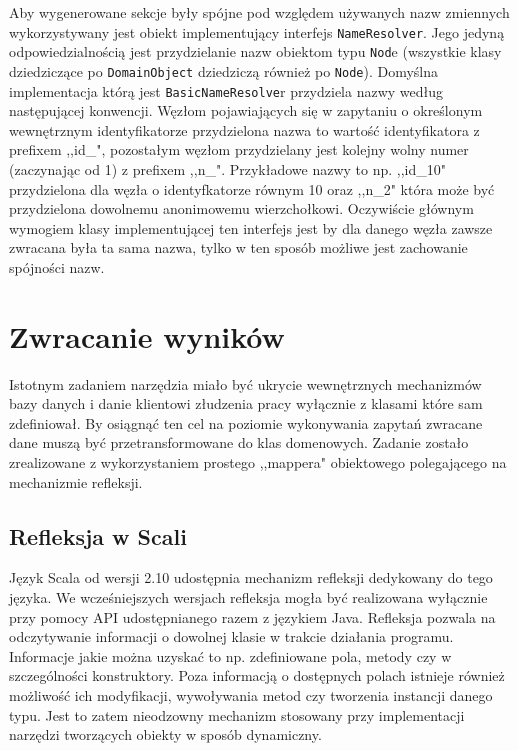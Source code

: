 \documentclass[brudnopis]{xmgr}
\begin{document}
Aby wygenerowane sekcje były spójne pod względem używanych nazw zmiennych wykorzystywany jest obiekt implementujący interfejs \texttt{NameResolver}. Jego jedyną odpowiedzialnością jest przydzielanie nazw obiektom typu \texttt{Nod}e (wszystkie klasy dziedziczące po \texttt{DomainObject} dziedziczą również po \texttt{Node}). Domyślna implementacja którą jest \texttt{BasicNameResolve}r przydziela nazwy według następującej konwencji. Węzłom pojawiających się w zapytaniu o określonym wewnętrznym identyfikatorze przydzielona nazwa to wartość identyfikatora z prefixem ,,id\_", pozostałym węzłom przydzielany jest kolejny wolny numer (zaczynając od 1) z prefixem ,,n\_". Przykładowe nazwy to np. ,,id\_10" przydzielona dla węzła o identyfkatorze równym 10 oraz ,,n\_2" która może być przydzielona dowolnemu anonimowemu wierzchołkowi. Oczywiście głównym wymogiem klasy implementującej ten interfejs jest by dla danego węzła zawsze zwracana była ta sama nazwa, tylko w ten sposób możliwe jest zachowanie spójności nazw.

\section{Zwracanie wyników}

Istotnym zadaniem narzędzia miało być ukrycie wewnętrznych mechanizmów bazy danych i danie klientowi złudzenia pracy wyłącznie z klasami które sam zdefiniował. By osiągnąć ten cel na poziomie wykonywania zapytań zwracane dane muszą być przetransformowane do klas domenowych. Zadanie zostało zrealizowane z wykorzystaniem prostego ,,mappera" obiektowego polegającego na mechanizmie refleksji.

\subsection{Refleksja w Scali}

Język Scala od wersji 2.10 udostępnia mechanizm refleksji dedykowany do tego języka. We wcześniejszych wersjach refleksja mogła być realizowana wyłącznie przy pomocy API udostępnianego razem z językiem Java. Refleksja pozwala na odczytywanie informacji o dowolnej klasie w trakcie działania programu. Informacje jakie można uzyskać to np. zdefiniowane pola, metody czy w szczególności konstruktory. Poza informacją o dostępnych polach istnieje również możliwość ich modyfikacji, wywoływania metod czy tworzenia instancji danego typu. Jest to zatem nieodzowny mechanizm stosowany przy implementacji narzędzi tworzących obiekty w sposób dynamiczny.
\end{document}
